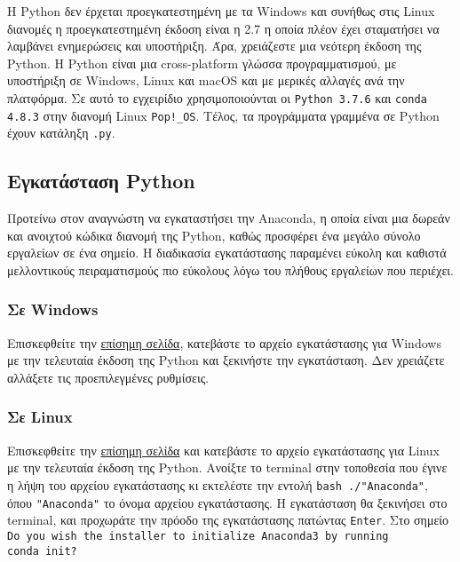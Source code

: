 \documentclass[a4paper,14pt]{extreport}
\begin{document}
Η Python δεν έρχεται προεγκατεστημένη με τα Windows και συνήθως στις Linux διανομές η προεγκατεστημένη έκδοση είναι η 2.7 η οποία πλέον έχει σταματήσει να λαμβάνει ενημερώσεις και υποστήριξη. Άρα, χρειάζεστε μια νεότερη έκδοση της  Python. Η Python είναι μια cross-platform γλώσσα προγραμματισμού, με υποστήριξη σε Windows, Linux και macOS και με μερικές αλλαγές ανά την πλατφόρμα. Σε αυτό το εγχειρίδιο χρησιμοποιούνται οι \lstinline{Python 3.7.6} και \lstinline{conda 4.8.3} στην διανομή Linux \lstinline{Pop!_OS}. Τέλος, τα προγράμματα γραμμένα σε Python έχουν κατάληξη \lstinline{.py}.

\subsection{Εγκατάσταση Python}

Προτείνω στον αναγνώστη να εγκαταστήσει την Anaconda, η οποία είναι μια δωρεάν και  ανοιχτού κώδικα διανομή της Python, καθώς προσφέρει ένα μεγάλο σύνολο εργαλείων σε ένα σημείο. Η διαδικασία εγκατάστασης παραμένει εύκολη και καθιστά μελλοντικούς πειραματισμούς πιο εύκολους λόγω του πλήθους εργαλείων που περιέχει.

\subsubsection{Σε Windows}

Επισκεφθείτε την \href{https://tinyurl.com/yc39u67t}{επίσημη σελίδα}, κατεβάστε το αρχείο εγκατάστασης για Windows με την τελευταία έκδοση της Python και ξεκινήστε την εγκατάσταση. Δεν χρειάζετε αλλάξετε τις προεπιλεγμένες ρυθμίσεις.

\subsubsection{Σε Linux}

Επισκεφθείτε την \href{https://tinyurl.com/yc39u67t}{επίσημη σελίδα} και κατεβάστε το αρχείο εγκατάστασης για Linux με την τελευταία έκδοση της Python. Ανοίξτε το terminal στην τοποθεσία που έγινε η λήψη του αρχείου εγκατάστασης κι εκτελέστε την εντολή \lstinline{bash ./"Anaconda"}, όπου \lstinline{"Anaconda"} το όνομα αρχείου εγκατάστασης. Η εγκατάσταση θα ξεκινήσει στο terminal, και προχωράτε την πρόοδο της εγκατάστασης πατώντας \lstinline{Enter}. Στο σημείο\\ \lstinline{Do you wish the installer to initialize Anaconda3 by running}\\ \lstinline{conda init?}
\end{document}
